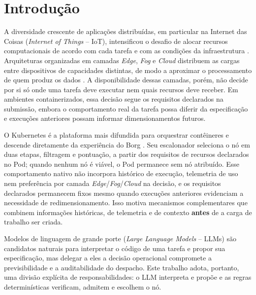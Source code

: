 \documentclass[11pt,a4paper]{article}
\newif\ifduascolunas \duascolunastrue
\begin{document}
\ifduascolunas
  \twocolumn[\begin{minipage}{\textwidth}\primeirapagina\end{minipage}]
\else
  \primeirapagina
\fi
\thispagestyle{primeira}

\section{Introdução}\label{sec:introducao}

A diversidade crescente de aplicações distribuídas, em particular na Internet
das Coisas (\textit{Internet of Things} -- IoT), intensificou o desafio de
alocar recursos computacionais de acordo com cada tarefa e com as condições
da infraestrutura \cite{bonomi2012fog}. Arquiteturas organizadas em camadas \textit{Edge},
\textit{Fog} e \textit{Cloud} distribuem as cargas entre dispositivos de
capacidades distintas, de modo a aproximar o processamento de quem produz os
dados \cite{bonomi2012fog,satyanarayanan2017edge}. A disponibilidade dessas
camadas, porém, não decide por si só onde uma tarefa deve executar nem quais
recursos deve receber. Em ambientes containerizados, essa decisão segue os
requisitos declarados na submissão, embora o comportamento real da tarefa
possa diferir da especificação e execuções anteriores possam informar
dimensionamentos futuros.

O Kubernetes é a plataforma mais difundida para orquestrar contêineres e
descende diretamente da experiência do Borg
\cite{burns2016borg}. Seu escalonador seleciona o nó em duas etapas, filtragem
e pontuação, a partir dos requisitos de recursos declarados no Pod; quando
nenhum nó é viável, o Pod permanece sem nó atribuído.
Esse comportamento nativo não incorpora histórico de execução, telemetria de
uso nem preferência por camada \textit{Edge}/\textit{Fog}/\textit{Cloud} na
decisão, e os requisitos declarados permanecem fixos mesmo quando execuções anteriores evidenciam a necessidade de redimensionamento. Isso motiva mecanismos complementares que combinem
informações históricas, de telemetria e de contexto \textbf{antes} de a
carga de trabalho ser criada.

Modelos de linguagem de grande porte (\textit{Large Language Models} --
LLMs) são candidatos naturais para interpretar o código de uma tarefa e
propor sua especificação, mas delegar a eles a decisão operacional
compromete a previsibilidade e a auditabilidade do despacho. Este trabalho
adota, portanto, uma divisão explícita de responsabilidades: o LLM interpreta
e propõe e as regras determinísticas verificam, admitem e escolhem o nó.
\end{document}
